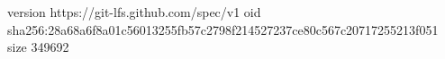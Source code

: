 version https://git-lfs.github.com/spec/v1
oid sha256:28a68a6f8a01c56013255fb57c2798f214527237ce80c567c20717255213f051
size 349692
